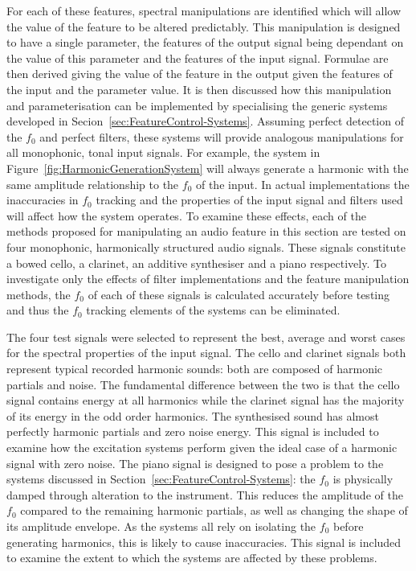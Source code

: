 		For each of these features, spectral manipulations are identified which will allow the value of the feature
		to be altered predictably. This manipulation is designed to have a single parameter, the features of the
		output signal being dependant on the value of this parameter and the features of the input signal.
		Formulae are then derived giving the value of the feature in the output given the features of the input and
		the parameter value. It is then discussed how this manipulation and parameterisation can be implemented by
		specialising the generic systems developed in Secion~\ref{sec:FeatureControl-Systems}. Assuming perfect
		detection of the $f_{0}$ and perfect filters, these systems will provide analogous manipulations for all
		monophonic, tonal input signals. For example, the system in Figure~\ref{fig:HarmonicGenerationSystem} will
		always generate a harmonic with the same amplitude relationship to the $f_{0}$ of the input. In actual
		implementations the inaccuracies in $f_{0}$ tracking and the properties of the input signal and filters
		used will affect how the system operates. To examine these effects, each of the methods proposed for
		manipulating an audio feature in this section are tested on four monophonic, harmonically structured audio
		signals. These signals constitute a bowed cello, a clarinet, an additive synthesiser and a piano
		respectively. To investigate only the effects of filter implementations and the feature manipulation
		methods, the $f_{0}$ of each of these signals is calculated accurately before testing and thus the $f_{0}$
		tracking elements of the systems can be eliminated.

		The four test signals were selected to represent the best, average and worst cases for the spectral
		properties of the input signal. The cello and clarinet signals both represent typical recorded harmonic
		sounds: both are composed of harmonic partials and noise. The fundamental difference between the two is
		that the cello signal contains energy at all harmonics while the clarinet signal has the majority of its
		energy in the odd order harmonics. The synthesised sound has almost perfectly harmonic partials and zero
		noise energy. This signal is included to examine how the excitation systems perform given the ideal case of
		a harmonic signal with zero noise. The piano signal is designed to pose a problem to the systems discussed
		in Section~\ref{sec:FeatureControl-Systems}: the $f_{0}$ is physically damped through alteration to the
		instrument. This reduces the amplitude of the $f_{0}$ compared to the remaining harmonic partials, as well
		as changing the shape of its amplitude envelope. As the systems all rely on isolating the $f_{0}$ before
		generating harmonics, this is likely to cause inaccuracies. This signal is included to examine the extent
		to which the systems are affected by these problems.

